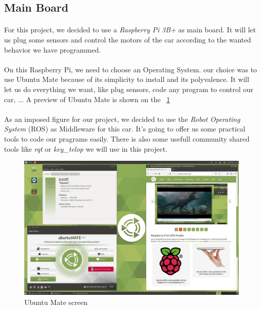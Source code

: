
\subsection{Main Board}
\paragraph{}For this project, we decided to use a \textit{Raspberry Pi 3B+}
as main board. It will let us plug some sensors and control the motors of
the car according to the wanted behavior we have programmed.

\paragraph{}On this Raspberry Pi, we need to choose an Operating System. our
choice was to use Ubuntu Mate because of its simplicity to install and its 
polyvalence. It will let us do everything we want, like plug sensors, code
any program to control our car, ... A preview of Ubuntu Mate is shown on
the ~\ref{fig:ubuntu}

\paragraph{}As an imposed figure for our project, we decided to use the 
\textit{Robot Operating System} (ROS) as Middleware for this car. It's
going to offer us some practical tools to code our pragrams easily.
There is also some usefull community shared tools like \textit{rqt}
or \textit{key\_telop} we will use in this project.

\begin{figure}[!ht]
    \begin{center}
        \includegraphics[scale=0.3]{Images/Ubuntu_mate.png}
    \end{center}
    \caption{Ubuntu Mate screen}
    \label{fig:ubuntu}
\end{figure}

